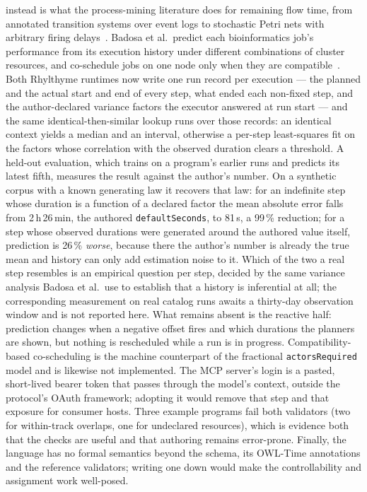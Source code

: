 \documentclass[10pt]{article}
\newcommand{\rt}{Rhylthyme}
\newcommand{\code}[1]{\texttt{#1}}
\begin{document}
instead is what the process-mining literature does for remaining flow time, from annotated transition systems over event logs to stochastic Petri nets with arbitrary firing delays~\cite{vanderaalst2011prediction,roggesolti2013remaining}. Badosa et al.\ predict each bioinformatics job's performance from its execution history under different combinations of cluster resources, and co-schedule jobs on one node only when they are compatible~\cite{badosa2019resource}. Both \rt{} runtimes now write one run record per execution --- the planned and the actual start and end of every step, what ended each non-fixed step, and the author-declared variance factors the executor answered at run start --- and the same identical-then-similar lookup runs over those records: an identical context yields a median and an interval, otherwise a per-step least-squares fit on the factors whose correlation with the observed duration clears a threshold. A held-out evaluation, which trains on a program's earlier runs and predicts its latest fifth, measures the result against the author's number. On a synthetic corpus with a known generating law it recovers that law: for an indefinite step whose duration is a function of a declared factor the mean absolute error falls from 2\,h\,26\,min, the authored \code{defaultSeconds}, to 81\,s, a 99\,\% reduction; for a step whose observed durations were generated around the authored value itself, prediction is 26\,\% \emph{worse}, because there the author's number is already the true mean and history can only add estimation noise to it. Which of the two a real step resembles is an empirical question per step, decided by the same variance analysis Badosa et al.\ use to establish that a history is inferential at all; the corresponding measurement on real catalog runs awaits a thirty-day observation window and is not reported here. What remains absent is the reactive half: prediction changes when a negative offset fires and which durations the planners are shown, but nothing is rescheduled while a run is in progress. Compatibility-based co-scheduling is the machine counterpart of the fractional \code{actorsRequired} model and is likewise not implemented. The MCP server's login is a pasted, short-lived bearer token that passes through the model's context, outside the protocol's OAuth framework; adopting it would remove that step and that exposure for consumer hosts. Three example programs fail both validators (two for within-track overlaps, one for undeclared resources), which is evidence both that the checks are useful and that authoring remains error-prone. Finally, the language has no formal semantics beyond the schema, its OWL-Time annotations and the reference validators; writing one down would make the controllability and assignment work well-posed.
\end{document}

